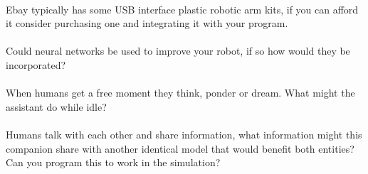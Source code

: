 \documentclass[11pt]{book}
\begin{document}
\paragraph{} Ebay typically has some USB interface plastic robotic arm kits, if you can afford it consider purchasing one and integrating it with your program.

\paragraph{} Could neural networks be used to improve your robot, if so how would they be incorporated?

\paragraph{} When humans get a free moment they think, ponder or dream. What might the assistant do while idle?

\paragraph{} Humans talk with each other and share information, what information might this companion share with another identical model that would benefit both entities? Can you program this to work in the simulation?
\end{document}
